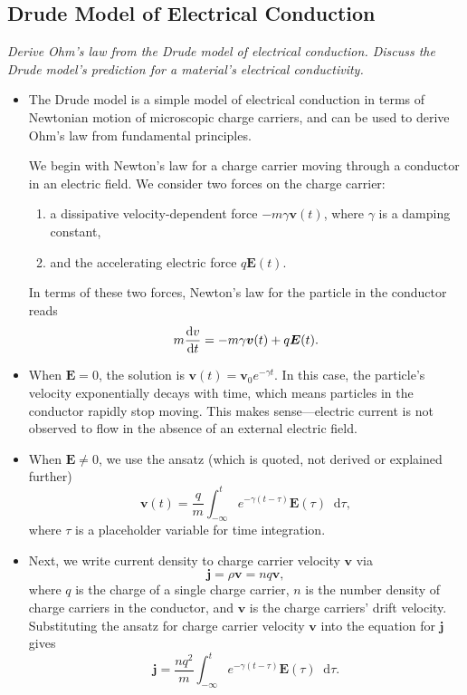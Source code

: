 \documentclass[11pt, a4paper]{article}
\newcommand{\diff}{\mathop{}\!\mathrm{d}} %
\renewcommand{\vec}[1]{\bm{#1}} %
\newcommand{\E}{\vec{E}} %
\renewcommand{\j}{\vec{j}}  %
\begin{document}
\subsection{Drude Model of Electrical Conduction}
\textit{Derive Ohm's law from the Drude model of electrical conduction. Discuss the Drude model's prediction for a material's electrical conductivity. }

\begin{itemize}
	\item The Drude model is a simple model of electrical conduction in terms of Newtonian motion of microscopic charge carriers, and can be used to derive Ohm's law from fundamental principles.
	
	We begin with Newton's law for a charge carrier moving through a conductor in an electric field. We consider two forces on the charge carrier:
	\begin{enumerate}
		\item a dissipative velocity-dependent force $ - m \gamma \vec{v}(t) $, where $ \gamma $ is a damping constant,
		
		\item and the accelerating electric force $ q \E(t) $.
	\end{enumerate}
	In terms of these two forces, Newton's law for the particle in the conductor reads
	\begin{equation*}
		m \dv{v}{t} = - m \gamma \vec{v}(t) + q \E(t).
	\end{equation*}
	
	\item When $ \E = 0 $, the solution is $ \vec{v}(t) = \vec{v}_{0} e^{- \gamma t}$. In this case, the particle's velocity exponentially decays with time, which means particles in the conductor rapidly stop moving. This makes sense---electric current is not observed to flow in the absence of an external electric field.
	
	\item When $ \E \neq 0 $, we use the ansatz (which is quoted, not derived or explained further)
	\begin{equation*}
		\vec{v}(t) = \frac{q}{m}\int_{-\infty}^{t}e^{-\gamma(t - \tau)}\E(\tau) \diff \tau,
	\end{equation*}
    where $ \tau $ is a placeholder variable for time integration.
	
    \item Next, we write current density to charge carrier velocity $ \vec{v} $ via
	\begin{equation*}
		\j = \rho \vec{v} = n q \vec{v},
	\end{equation*}
	where $ q $ is the charge of a single charge carrier, $ n $ is the number density of charge carriers in the conductor, and $ \vec{v} $ is the charge carriers' drift velocity. Substituting the ansatz for charge carrier velocity $ \vec{v} $ into the equation for $ \j $ gives
	\begin{equation*}
		\j = \frac{nq^{2}}{m}\int_{-\infty}^{t}e^{-\gamma(t - \tau)}\E(\tau) \diff \tau.
	\end{equation*}
	

\end{itemize}
\end{document}
